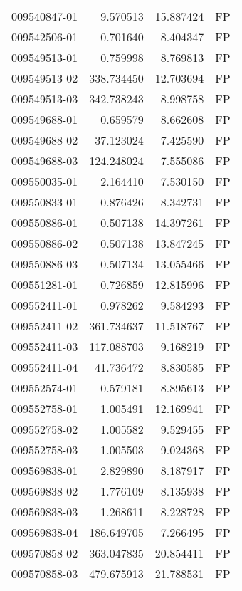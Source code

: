 \begin{tabular}{lrrl}
009540847-01 &    9.570513 &      15.887424 &   FP \\
009542506-01 &    0.701640 &       8.404347 &   FP \\
009549513-01 &    0.759998 &       8.769813 &   FP \\
009549513-02 &  338.734450 &      12.703694 &   FP \\
009549513-03 &  342.738243 &       8.998758 &   FP \\
009549688-01 &    0.659579 &       8.662608 &   FP \\
009549688-02 &   37.123024 &       7.425590 &   FP \\
009549688-03 &  124.248024 &       7.555086 &   FP \\
009550035-01 &    2.164410 &       7.530150 &   FP \\
009550833-01 &    0.876426 &       8.342731 &   FP \\
009550886-01 &    0.507138 &      14.397261 &   FP \\
009550886-02 &    0.507138 &      13.847245 &   FP \\
009550886-03 &    0.507134 &      13.055466 &   FP \\
009551281-01 &    0.726859 &      12.815996 &   FP \\
009552411-01 &    0.978262 &       9.584293 &   FP \\
009552411-02 &  361.734637 &      11.518767 &   FP \\
009552411-03 &  117.088703 &       9.168219 &   FP \\
009552411-04 &   41.736472 &       8.830585 &   FP \\
009552574-01 &    0.579181 &       8.895613 &   FP \\
009552758-01 &    1.005491 &      12.169941 &   FP \\
009552758-02 &    1.005582 &       9.529455 &   FP \\
009552758-03 &    1.005503 &       9.024368 &   FP \\
009569838-01 &    2.829890 &       8.187917 &   FP \\
009569838-02 &    1.776109 &       8.135938 &   FP \\
009569838-03 &    1.268611 &       8.228728 &   FP \\
009569838-04 &  186.649705 &       7.266495 &   FP \\
009570858-02 &  363.047835 &      20.854411 &   FP \\
009570858-03 &  479.675913 &      21.788531 &   FP \\

\end{tabular}
